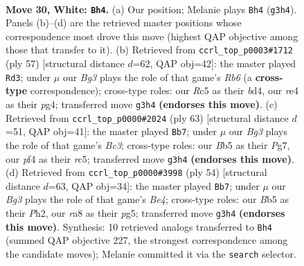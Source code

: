 \documentclass[11pt]{article}
\begin{document}
\clearpage

\begin{figure}[p]\centering
\begin{subfigure}{0.46\textwidth}\centering
\resizebox{\linewidth}{!}{%
\newchessgame
\chessboard[
  setfen={rn4k1/8/4p3/1BRb3p/4rp2/6BP/PR3P2/6K1 w - - 0 30},
  showmover=false,
  pgfstyle=straightmove, color=movearrow, markmove={g3-h4}
]}
\caption{}
\end{subfigure}\hfill
\begin{subfigure}{0.46\textwidth}\centering
\resizebox{\linewidth}{!}{%
\newchessgame
\chessboard[
  setfen={7r/5kp1/3R1b1p/p7/3B1PP1/1r6/1P5P/1K4R1 b - - 1 29},
  showmover=false,
  pgfstyle=straightmove, color=movearrow, markmove={b3-d3}
]}
\caption{}
\end{subfigure}
\\[4pt]
\begin{subfigure}{0.46\textwidth}\centering
\resizebox{\linewidth}{!}{%
\newchessgame
\chessboard[
  setfen={6k1/6p1/p1b1rp2/2R5/6rP/6B1/PP3RPK/8 b - - 3 32},
  showmover=false,
  pgfstyle=straightmove, color=movearrow, markmove={c6-b7}
]}
\caption{}
\end{subfigure}\hfill
\begin{subfigure}{0.46\textwidth}\centering
\resizebox{\linewidth}{!}{%
\newchessgame
\chessboard[
  setfen={2r2r2/2Bk2bp/p2P2b1/1p2p1p1/4B1P1/K7/P2R3P/4R3 w - - 6 28},
  showmover=false,
  pgfstyle=straightmove, color=movearrow, markmove={e4-b7}
]}
\caption{}
\end{subfigure}
\caption{\textbf{Move 30, White: \texttt{Bh4}.} (a) Our position; Melanie plays \texttt{Bh4} (\texttt{g3h4}). Panels (b)--(d) are the retrieved master positions whose correspondence most drove this move (highest QAP objective among those that transfer to it). (b) Retrieved from \texttt{ccrl\_top\_p0003\#1712} (ply 57) [structural distance $d$=62, QAP obj=42]: the master played \texttt{Rd3}; under $\mu$ our \emph{Bg3} plays the role of that game's \emph{Rb6} (a \textbf{cross-type} correspondence); cross-type roles: our \emph{R}c5 as their \emph{b}d4, our \emph{r}e4 as their \emph{p}g4; transferred move \texttt{g3h4} \textbf{(endorses this move)}. (c) Retrieved from \texttt{ccrl\_top\_p0000\#2024} (ply 63) [structural distance $d$=51, QAP obj=41]: the master played \texttt{Bb7}; under $\mu$ our \emph{Bg3} plays the role of that game's \emph{Bc3}; cross-type roles: our \emph{B}b5 as their \emph{P}g7, our \emph{p}f4 as their \emph{r}c5; transferred move \texttt{g3h4} \textbf{(endorses this move)}. (d) Retrieved from \texttt{ccrl\_top\_p0000\#3998} (ply 54) [structural distance $d$=63, QAP obj=34]: the master played \texttt{Bb7}; under $\mu$ our \emph{Bg3} plays the role of that game's \emph{Be4}; cross-type roles: our \emph{B}b5 as their \emph{P}h2, our \emph{r}a8 as their \emph{p}g5; transferred move \texttt{g3h4} \textbf{(endorses this move)}. Synthesis: 10 retrieved analogs transferred to \texttt{Bh4} (summed QAP objective 227, the strongest correspondence among the candidate moves); Melanie committed it via the \texttt{search} selector.}
\label{fig:thought-m58}
\end{figure}
\end{document}
